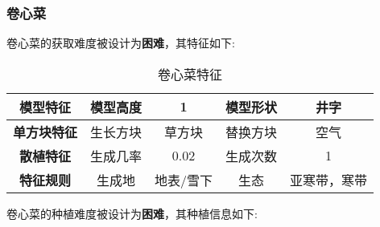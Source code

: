 \subsubsection{卷心菜}

卷心菜的获取难度被设计为\textbf{困难}，其特征如下:
\begin{table}[H]
    \centering
    \caption{卷心菜特征}
    \label{table:卷心菜特征}
    \setlength{\tabcolsep}{4mm}
    \begin{tabular}{c|cc|cc}
        \toprule
        \textbf{模型特征}   & 模型高度 & 1      & 模型形状 & 井字     \\
        \midrule
        \textbf{单方块特征} & 生长方块 & 草方块 & 替换方块 & 空气     \\
        \midrule
        \textbf{散植特征}   & 生成几率 & 0.02   & 生成次数 & 1        \\
        \midrule
        \textbf{特征规则}   & 生成地   & 地表/雪下   & 生态     & 亚寒带，寒带 \\
        \bottomrule
    \end{tabular}
\end{table}


卷心菜的种植难度被设计为\textbf{困难}，其种植信息如下:

